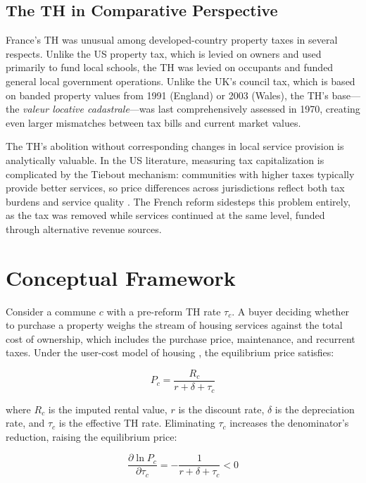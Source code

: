 \documentclass[12pt]{article}
\begin{document}
\subsection{The TH in Comparative Perspective}

France's TH was unusual among developed-country property taxes in several respects. Unlike the US property tax, which is levied on owners and used primarily to fund local schools, the TH was levied on occupants and funded general local government operations. Unlike the UK's council tax, which is based on banded property values from 1991 (England) or 2003 (Wales), the TH's base---the \emph{valeur locative cadastrale}---was last comprehensively assessed in 1970, creating even larger mismatches between tax bills and current market values.

The TH's abolition without corresponding changes in local service provision is analytically valuable. In the US literature, measuring tax capitalization is complicated by the Tiebout mechanism: communities with higher taxes typically provide better services, so price differences across jurisdictions reflect both tax burdens and service quality \citep{ross1999estimating}. The French reform sidesteps this problem entirely, as the tax was removed while services continued at the same level, funded through alternative revenue sources.


\section{Conceptual Framework}

Consider a commune $c$ with a pre-reform TH rate $\tau_c$. A buyer deciding whether to purchase a property weighs the stream of housing services against the total cost of ownership, which includes the purchase price, maintenance, and recurrent taxes. Under the user-cost model of housing \citep{poterba1984tax}, the equilibrium price satisfies:

\begin{equation}
P_c = \frac{R_c}{r + \delta + \tau_c}
\label{eq:usercost}
\end{equation}

\noindent where $R_c$ is the imputed rental value, $r$ is the discount rate, $\delta$ is the depreciation rate, and $\tau_c$ is the effective TH rate. Eliminating $\tau_c$ increases the denominator's reduction, raising the equilibrium price:

\begin{equation}
\frac{\partial \ln P_c}{\partial \tau_c} = -\frac{1}{r + \delta + \tau_c} < 0
\label{eq:semi_elasticity}
\end{equation}
\end{document}
